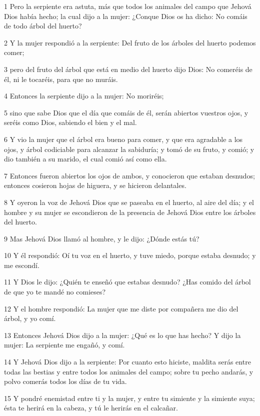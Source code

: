 \par 1 Pero la serpiente era astuta, más que todos los animales del campo que Jehová Dios había hecho; la cual dijo a la mujer: ¿Conque Dios os ha dicho: No comáis de todo árbol del huerto?
\par 2 Y la mujer respondió a la serpiente: Del fruto de los árboles del huerto podemos comer;
\par 3 pero del fruto del árbol que está en medio del huerto dijo Dios: No comeréis de él, ni le tocaréis, para que no muráis.
\par 4 Entonces la serpiente dijo a la mujer: No moriréis;
\par 5 sino que sabe Dios que el día que comáis de él, serán abiertos vuestros ojos, y seréis como Dios, sabiendo el bien y el mal.
\par 6 Y vio la mujer que el árbol era bueno para comer, y que era agradable a los ojos, y árbol codiciable para alcanzar la sabiduría; y tomó de su fruto, y comió; y dio también a su marido, el cual comió así como ella.
\par 7 Entonces fueron abiertos los ojos de ambos, y conocieron que estaban desnudos; entonces cosieron hojas de higuera, y se hicieron delantales.
\par 8 Y oyeron la voz de Jehová Dios que se paseaba en el huerto, al aire del día; y el hombre y su mujer se escondieron de la presencia de Jehová Dios entre los árboles del huerto.
\par 9 Mas Jehová Dios llamó al hombre, y le dijo: ¿Dónde estás tú?
\par 10 Y él respondió: Oí tu voz en el huerto, y tuve miedo, porque estaba desnudo; y me escondí.
\par 11 Y Dios le dijo: ¿Quién te enseñó que estabas desnudo? ¿Has comido del árbol de que yo te mandé no comieses?
\par 12 Y el hombre respondió: La mujer que me diste por compañera me dio del árbol, y yo comí.
\par 13 Entonces Jehová Dios dijo a la mujer: ¿Qué es lo que has hecho? Y dijo la mujer: La serpiente me engañó, y comí.
\par 14 Y Jehová Dios dijo a la serpiente: Por cuanto esto hiciste, maldita serás entre todas las bestias y entre todos los animales del campo; sobre tu pecho andarás, y polvo comerás todos los días de tu vida.
\par 15 Y pondré enemistad entre ti y la mujer, y entre tu simiente y la simiente suya; ésta te herirá en la cabeza, y tú le herirás en el calcañar.
